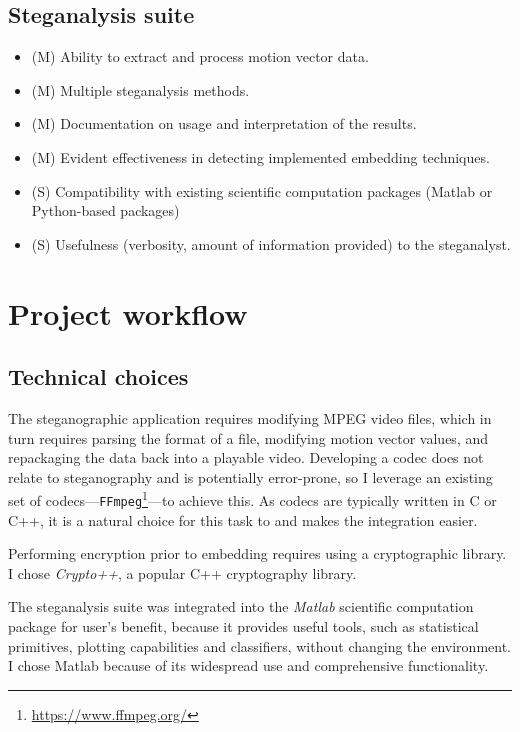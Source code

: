 \documentclass[12pt,british,twoside,notitlepage,usenames,dvipsnames,hypens,final]{report}
\numberwithin{equation}{section}
\numberwithin{figure}{section}
\begin{document}
\subsection{Steganalysis suite}
\label{req-steg-suite}
\begin{itemize}
\item (M) Ability to extract and process motion vector data.
\item (M) Multiple steganalysis methods.
\item (M) Documentation on usage and interpretation of the results.
\item (M) Evident effectiveness in detecting implemented embedding techniques.
\item (S) Compatibility with existing scientific computation packages (Matlab or Python-based packages)
\item (S) Usefulness (verbosity, amount of information provided) to the steganalyst.
\end{itemize}

\section{Project workflow}

\subsection{Technical choices}
\label{tech-choices}

The steganographic application requires modifying MPEG video files, which in turn requires parsing the format of a file, modifying motion vector values, and repackaging the data back into a playable video. Developing a codec does not relate to steganography and is potentially error-prone, so I leverage an existing set of codecs---\texttt{FFmpeg}\footnote{\url{https://www.ffmpeg.org/}}---to achieve this. As codecs are typically written in C or C++, it is a natural choice for this task to and makes the integration easier.

Performing encryption prior to embedding requires using a cryptographic library. I chose \emph{Crypto++}, a popular C++ cryptography library.

The steganalysis suite was integrated into the \emph{Matlab} scientific computation package for user's benefit, because it provides useful tools, such as statistical primitives, plotting capabilities and classifiers, without changing the environment. I chose Matlab because of its widespread use and comprehensive functionality.
\end{document}
